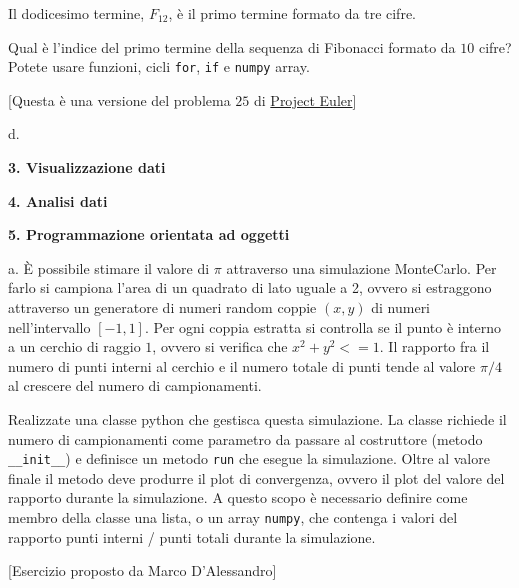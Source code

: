 \documentclass[addpoints]{exam}
\newenvironment{palatino}{\fontfamily{ppl}\selectfont}{\par}
\begin{document}
\begin{palatino}
Il dodicesimo termine, $F_{12}$, è il primo termine formato da tre cifre.

Qual è l'indice del primo termine della sequenza di Fibonacci formato da $10$ cifre? 
Potete usare funzioni, cicli \texttt{for}, \texttt{if} e \texttt{numpy} array.

\hphantom{ciao}

[Questa è una versione del problema $25$ di \href{https://projecteuler.net/problem=25}{Project Euler}]

\hphantom{ciao}
 
d. \quad 	

\hphantom{ciao}
	
\textbf{3. Visualizzazione dati} \\

\hphantom{ciao}


\textbf{4. Analisi dati} \\


\hphantom{ciao}

\textbf{5. Programmazione orientata ad oggetti}

\hphantom{ciao}

a. \quad È possibile stimare il valore di $\pi$ attraverso una simulazione MonteCarlo.
Per farlo si campiona l'area di un quadrato di lato uguale a 2, ovvero si estraggono attraverso un generatore di numeri random coppie $(x,y)$ di numeri nell'intervallo $[-1,1]$.
Per ogni coppia estratta si controlla se il punto è interno a un cerchio di raggio $1$, ovvero si verifica che $x^2+y^2 <= 1$. 
Il rapporto fra il numero di punti interni al cerchio e il numero totale di punti tende al valore $\pi/4$ al crescere del numero di campionamenti.

\hphantom{ciao}

Realizzate una classe python che gestisca questa simulazione. 
La classe richiede il numero di campionamenti come parametro da passare al costruttore (metodo \texttt{\_\_init\_\_}) e definisce un metodo \texttt{run} che esegue la simulazione. 
Oltre al valore finale il metodo deve produrre il plot di convergenza, ovvero il plot del valore del rapporto durante la simulazione. 
A questo scopo è necessario definire come membro della classe una lista, o un array \texttt{numpy}, che contenga i valori del rapporto punti interni / punti totali durante la simulazione.

\hphantom{ciao}

[Esercizio proposto da Marco D'Alessandro]

\FloatBarrier

\end{palatino}
\end{document}
